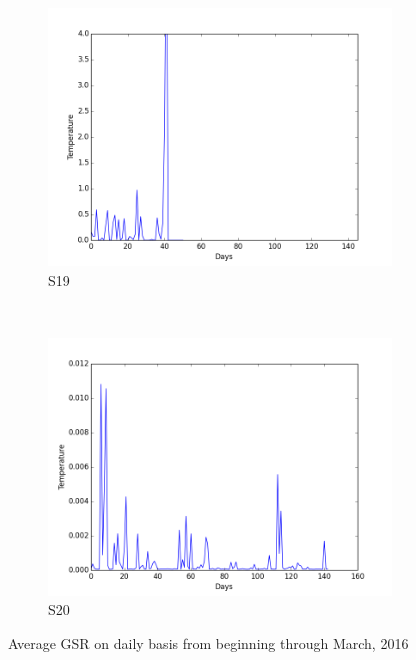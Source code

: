 \documentclass[12pt]{article} %
\begin{document}
\begin{figure}[H]
    \begin{subfigure}[b]{0.2\textwidth}
        \includegraphics[width=\textwidth]{img/graphs/19-gsr-1}
        \caption{S19}
        \label{fig:s19GSR}
    \end{subfigure}
    ~ %
    \begin{subfigure}[b]{0.2\textwidth}
        \includegraphics[width=\textwidth]{img/graphs/20-gsr-1}
        \caption{S20}
        \label{fig:s20GSR}
    \end{subfigure}
    \caption{Average GSR on daily basis from beginning through March, 2016}
    \label{fig:avgGSR}
\end{figure}
\end{document}
